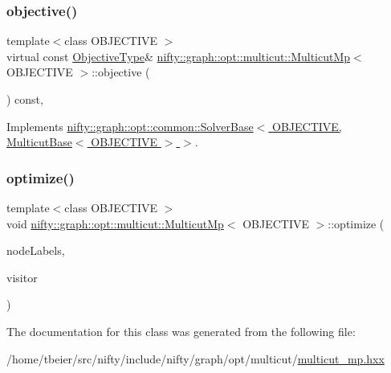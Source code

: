 \mbox{\label{classnifty_1_1graph_1_1opt_1_1multicut_1_1MulticutMp_a78aabd921e89cc3b4f4a5287a97b27ac}} 
\subsubsection{\texorpdfstring{objective()}{objective()}}
{\footnotesize\ttfamily template$<$class O\+B\+J\+E\+C\+T\+I\+VE $>$ \\
virtual const \hyperlink{classnifty_1_1graph_1_1opt_1_1multicut_1_1MulticutMp_a9fefe9d9756a1eef71329656d2fdf9f4}{Objective\+Type}\& \hyperlink{classnifty_1_1graph_1_1opt_1_1multicut_1_1MulticutMp}{nifty\+::graph\+::opt\+::multicut\+::\+Multicut\+Mp}$<$ O\+B\+J\+E\+C\+T\+I\+VE $>$\+::objective (\begin{DoxyParamCaption}{ }\end{DoxyParamCaption}) const\hspace{0.3cm}{\ttfamily [inline]}, {\ttfamily [virtual]}}



Implements \hyperlink{classnifty_1_1graph_1_1opt_1_1common_1_1SolverBase_a55e9eb645c07d6e0782ebfb990ab3c84}{nifty\+::graph\+::opt\+::common\+::\+Solver\+Base$<$ O\+B\+J\+E\+C\+T\+I\+V\+E, Multicut\+Base$<$ O\+B\+J\+E\+C\+T\+I\+V\+E $>$ $>$}.

\mbox{\label{classnifty_1_1graph_1_1opt_1_1multicut_1_1MulticutMp_a7f9c04be26314b677b58570dd5f9fbfa}} 
\subsubsection{\texorpdfstring{optimize()}{optimize()}}
{\footnotesize\ttfamily template$<$class O\+B\+J\+E\+C\+T\+I\+VE $>$ \\
void \hyperlink{classnifty_1_1graph_1_1opt_1_1multicut_1_1MulticutMp}{nifty\+::graph\+::opt\+::multicut\+::\+Multicut\+Mp}$<$ O\+B\+J\+E\+C\+T\+I\+VE $>$\+::optimize (\begin{DoxyParamCaption}\item[{\hyperlink{classnifty_1_1graph_1_1opt_1_1multicut_1_1MulticutMp_a7afb88ab31185de5cef8a3d98022c0a2}{Node\+Labels\+Type} \&}]{node\+Labels,  }\item[{\hyperlink{classnifty_1_1graph_1_1opt_1_1multicut_1_1MulticutMp_af8d6587bb26bf816e5900ec4831f32b9}{Visitor\+Base\+Type} $\ast$}]{visitor }\end{DoxyParamCaption})\hspace{0.3cm}{\ttfamily [virtual]}}



The documentation for this class was generated from the following file\+:\begin{DoxyCompactItemize}
\item 
/home/tbeier/src/nifty/include/nifty/graph/opt/multicut/\hyperlink{multicut__mp_8hxx}{multicut\+\_\+mp.\+hxx}\end{DoxyCompactItemize}
